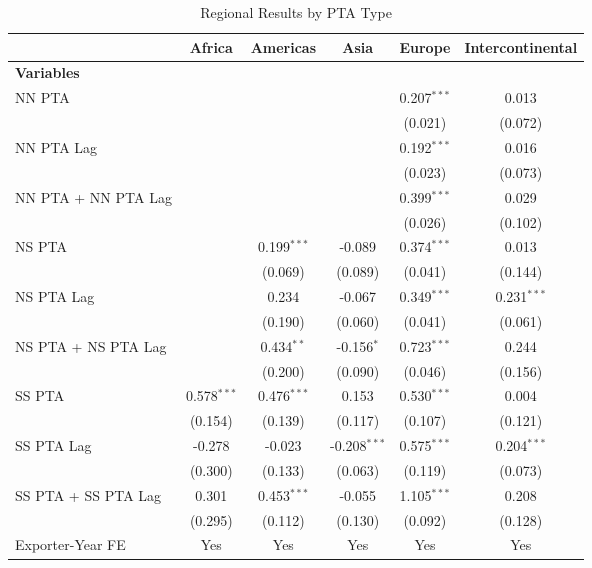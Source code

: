 \begin{table}[htbp]
    \centering
    \caption{Regional Results by PTA Type}
    \label{tab:pta_types}
    \begin{adjustbox}{max width=\textwidth}
    \begin{tabular}{lccccc}
    \hline
     & \multicolumn{1}{c}{Africa} & \multicolumn{1}{c}{Americas} & \multicolumn{1}{c}{Asia} & \multicolumn{1}{c}{Europe} & \multicolumn{1}{c}{Intercontinental} \\
    \hline
    \textbf{Variables} &  &  &  &  &  \\
    \hline
    NN PTA &  &  &  & 0.207$^{\ast\ast\ast}$ & 0.013 \\
     &  &  &  & (0.021) & (0.072) \\
    NN PTA Lag &  &  &  & 0.192$^{\ast\ast\ast}$ & 0.016 \\
     &  &  &  & (0.023) & (0.073) \\
    NN PTA + NN PTA Lag &  &  &  & 0.399$^{\ast\ast\ast}$ & 0.029 \\
     &  &  &  & (0.026) & (0.102) \\
    \hline
    NS PTA &  & 0.199$^{\ast\ast\ast}$ & -0.089 & 0.374$^{\ast\ast\ast}$ & 0.013 \\
     &  & (0.069) & (0.089) & (0.041) & (0.144) \\
    NS PTA Lag &  & 0.234 & -0.067 & 0.349$^{\ast\ast\ast}$ & 0.231$^{\ast\ast\ast}$ \\
     &  & (0.190) & (0.060) & (0.041) & (0.061) \\
    NS PTA + NS PTA Lag &  & 0.434$^{\ast\ast}$ & -0.156$^{\ast}$ & 0.723$^{\ast\ast\ast}$ & 0.244 \\
     &  & (0.200) & (0.090) & (0.046) & (0.156) \\
    \hline
    SS PTA & 0.578$^{\ast\ast\ast}$ & 0.476$^{\ast\ast\ast}$ & 0.153 & 0.530$^{\ast\ast\ast}$ & 0.004 \\
     & (0.154) & (0.139) & (0.117) & (0.107) & (0.121) \\
    SS PTA Lag & -0.278 & -0.023 & -0.208$^{\ast\ast\ast}$ & 0.575$^{\ast\ast\ast}$ & 0.204$^{\ast\ast\ast}$ \\
     & (0.300) & (0.133) & (0.063) & (0.119) & (0.073) \\
    SS PTA + SS PTA Lag & 0.301 & 0.453$^{\ast\ast\ast}$ & -0.055 & 1.105$^{\ast\ast\ast}$ & 0.208 \\
     & (0.295) & (0.112) & (0.130) & (0.092) & (0.128) \\
    \hline
    Exporter-Year FE & Yes & Yes & Yes & Yes & Yes \\

\end{tabular}
\end{adjustbox}
\end{table}
